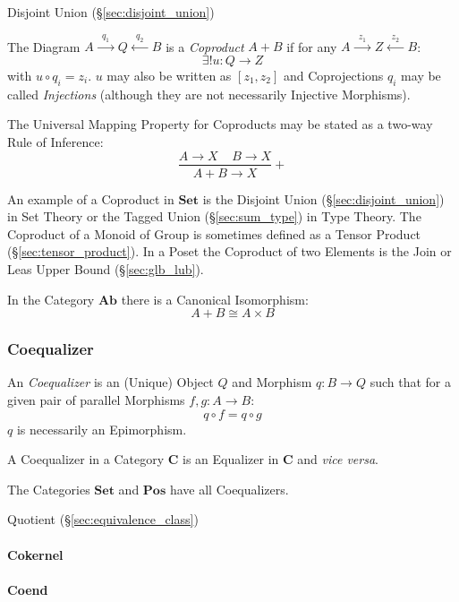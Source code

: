 Disjoint Union (\S\ref{sec:disjoint_union})

The Diagram $A \xrightarrow{\;\;q_1\;\;} Q \xleftarrow{\;\;q_2\;\;} B$
is a \emph{Coproduct} $A + B$ if for any $A \xrightarrow{\;\;z_1\;\;}
Z \xleftarrow{\;\;z_2\;\;} B$:
\[
  \exists!u : Q \rightarrow Z
\]
with $u \circ q_i = z_i$. $u$ may also be written as $[ z_1, z_2 ]$
and Coprojections $q_i$ may be called \emph{Injections} (although they
are not necessarily Injective Morphisms).

The Universal Mapping Property for Coproducts may be stated as a
two-way Rule of Inference:
\[
  {
    \frac{A \rightarrow X \;\;\;\; B \rightarrow X}
    {A + B \rightarrow X}
  }+
\]

An example of a Coproduct in $\mathbf{Set}$ is the Disjoint Union
(\S\ref{sec:disjoint_union}) in Set Theory or the Tagged Union
(\S\ref{sec:sum_type}) in Type Theory. The Coproduct of a Monoid of
Group is sometimes defined as a Tensor Product
(\S\ref{sec:tensor_product}). In a Poset the Coproduct of two Elements
is the Join or Leas Upper Bound (\S\ref{sec:glb_lub}).

In the Category $\mathbf{Ab}$ there is a Canonical
Isomorphism:\cite{awodey06}
\[
  A + B \cong A \times B
\]



\subsubsection{Coequalizer}\label{sec:coequalizer}

An \emph{Coequalizer} is an (Unique) Object $Q$ and Morphism $q: B
\rightarrow Q$ such that for a given pair of parallel Morphisms $f,g :
A \rightarrow B$:
\[
  q \circ f = q \circ g
\]
$q$ is necessarily an Epimorphism.

A Coequalizer in a Category $\mathbf{C}$ is an Equalizer in
$\mathbf{C}$ and \emph{vice versa}.

The Categories $\mathbf{Set}$ and $\mathbf{Pos}$ have all
Coequalizers.

Quotient (\S\ref{sec:equivalence_class})



\paragraph{Cokernel}\label{sec:cokernel}

\paragraph{Coend}\label{sec:coend}




